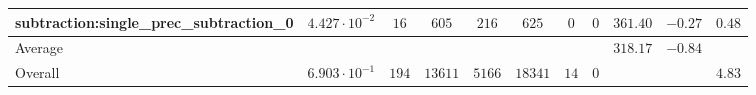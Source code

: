 \begin{tabular}{|l|c|c|c|c|c|c|c|c|c|c|}
subtraction:single\_prec\_subtraction\_0         & $ 4.427 \cdot 10^{-2} $ & $ 16     $ & $ 605   $ & $ 216  $ & $ 625   $ & $ 0  $ & $ 0 $ & $ 361.40      $ & $ -0.27   $ & $ 0.48    $ \\
\hline
Average                                          & $                     $ & $        $ & $       $ & $      $ & $       $ & $    $ & $   $ & $ 318.17      $ & $ -0.84   $ & $         $ \\
\hline
Overall                                          & $ 6.903 \cdot 10^{-1} $ & $ 194    $ & $ 13611 $ & $ 5166 $ & $ 18341 $ & $ 14 $ & $ 0 $ & $             $ & $         $ & $ 4.83    $ \\
\hline
\end{tabular}
